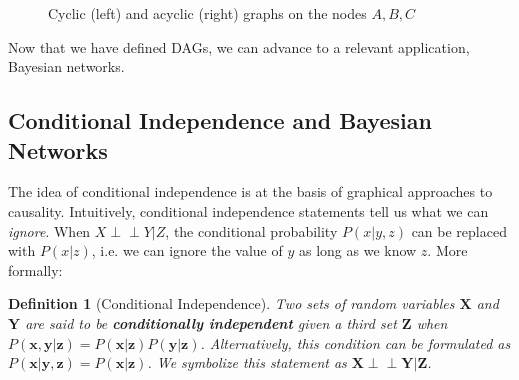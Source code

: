 \documentclass[12pt,twoside]{reedthesis}
\newtheorem{definition}{Definition}[section]
\theoremstyle{definition}
\newcommand{\dsep}{\perp \!\!\!\perp}
\begin{document}
\begin{figure}
\centering
{}

\caption{Cyclic (left) and acyclic (right) graphs on the nodes $A,B,C$} \label{fig:M1}
\end{figure}

Now that we have defined DAGs, we can advance to a relevant application, Bayesian networks.

\subsection{Conditional Independence and Bayesian Networks}

The idea of conditional independence is at the basis of graphical approaches to causality. Intuitively, conditional independence statements tell us what we can \emph{ignore}. When $X \dsep Y | Z$, the conditional probability $P(x  | y, z)$ can be replaced with $P(x  | z)$, i.e. we can ignore the value of $y$ as long as we know $z$. More formally:

\begin{definition}[Conditional Independence]
Two sets of random variables $\mathbf{X}$ and $\mathbf{Y}$ are said to be \emph{\textbf{conditionally independent}} given a third set $\mathbf{Z}$ when $P(\mathbf{x}, \mathbf{y} | \mathbf{z}) = P(\mathbf{x} | \mathbf{z})P(\mathbf{y} | \mathbf{z})$. Alternatively, this condition can be formulated as $P(\mathbf{x} | \mathbf{y}, \mathbf{z}) = P(\mathbf{x}| \mathbf{z})$. We symbolize this statement as $\mathbf{X} \dsep \mathbf{Y}  | \mathbf{Z}$.
\end{definition}
\end{document}
